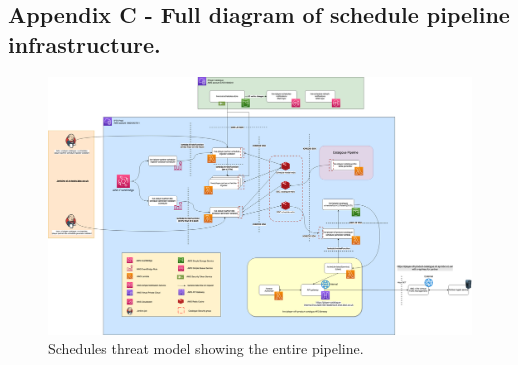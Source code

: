 \begin{landscape}
  \subsection{Appendix C - Full diagram of schedule pipeline infrastructure.}
    \begin{figure}[H]
      \centering
      \includegraphics[width=18cm]{assets/schedulesThreatModel.drawio.png}
      \caption{Schedules threat model showing the entire pipeline.}
    \end{figure}  
\end{landscape}
